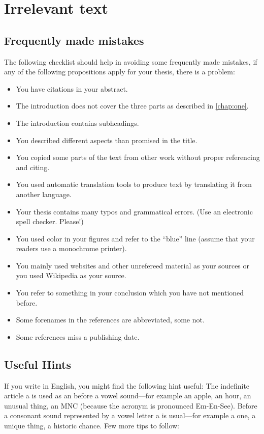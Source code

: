 \chapter{Irrelevant text}
\label{chap:four}

\section{Frequently made mistakes}

The following checklist should help in avoiding some frequently made mistakes, if any of the following propositions apply for your thesis, there is a problem:

\begin{itemize} 
		\item You have citations in your abstract.
		\item The introduction does not cover the three parts as described in \autoref{chap:one}.
		\item The introduction contains subheadings.
		\item You described different aspects than promised in the title.
		\item You copied some parts of the text from other work without proper referencing and citing.
		\item You used automatic translation tools to produce text by translating it from another language.
		\item Your thesis contains many typos and grammatical errors. (Use an electronic spell checker. Please!)
		\item You used color in your figures and refer to the ``blue'' line (assume that your readers use a monochrome printer).
		\item You mainly used websites and other unrefereed material as your sources or you used Wikipedia as your source.
		\item You refer to something in your conclusion which you have not mentioned before.
		\item Some forenames in the references are abbreviated, some not.
		\item Some references miss a publishing date.
\end{itemize}


\section{Useful Hints}

If you write in English, you might find the following hint
useful: The indefinite article a is used as an before a
vowel sound---for example an apple, an hour, an unusual
thing, an \ac{MNC} (because the acronym is pronounced Em-En-See). Before a consonant sound represented
by a vowel letter a is usual---for example a one, a
unique thing, a historic chance. Few more tips to follow:


